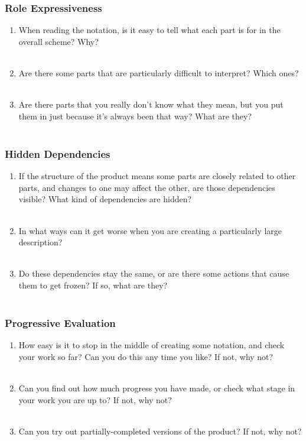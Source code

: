 \documentclass[14pt]{article}
\newcommand{\answerbox}{
\fbox{
\begin{minipage}{16cm}
\hfill\vspace{2cm}
\end{minipage}
}\\
}
\begin{document}
\subsubsection{Role Expressiveness}

\begin{enumerate}
\item When reading the notation, is it easy to tell what each part is for in the overall scheme? Why?\\
\answerbox
\item Are there some parts that are particularly difficult to interpret? Which ones?\\
\answerbox
\item Are there parts that you really don’t know what they mean, but you put them in just because it’s always been that way? What are they?\\
\answerbox
\end{enumerate}

\subsubsection{Hidden Dependencies}

\begin{enumerate}
\item If the structure of the product means some parts are closely related to other parts, and changes to one may affect the other, are those dependencies visible? What kind of dependencies are hidden?\\
\answerbox
\item In what ways can it get worse when you are creating a particularly large description?\\
\answerbox

\pagebreak

\item Do these dependencies stay the same, or are there some actions that cause them to get frozen? If so, what are they?\\
\answerbox
\end{enumerate}

\subsubsection{Progressive Evaluation}

\begin{enumerate}
\item How easy is it to stop in the middle of creating some notation, and check your work so far? Can you do this any time you like? If not, why not?\\
\answerbox
\item Can you find out how much progress you have made, or check what stage in your work you are up to? If not, why not?\\
\answerbox
\item Can you try out partially-completed versions of the product? If not, why not?\\
\answerbox
\end{enumerate}
\end{document}
